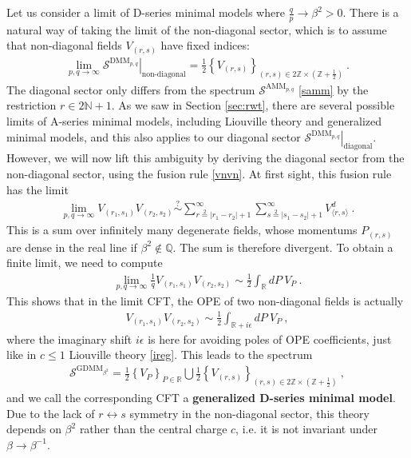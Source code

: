 \documentclass[12pt, a4paper]{article}
\newcommand{\myindex}[1]{\textbf{\boldmath #1}}
\theoremstyle{break}
\begin{document}
Let us consider a limit of D-series minimal models where $\frac{q}{p}\to \beta^2>0$. There is a natural way of taking the limit of the non-diagonal sector, which is to assume that non-diagonal fields $V_{(r,s)}$ have fixed indices:
\begin{align}
 \lim_{p,q\to\infty} \left. \mathcal{S}^{\text{DMM}_{p,q}} \right|_{\text{non-diagonal}} = 
 \frac12\left\{V_{(r,s)} \right\}_{ (r,s)\in 2\mathbb{Z}\times (\mathbb{Z}+\frac12)}\ .
\end{align}
The diagonal sector only differs from the spectrum $\mathcal{S}^{\text{AMM}_{p,q}}$ \eqref{samm} by the restriction $r\in 2\mathbb{N}+1$. 
As we saw in Section \ref{sec:rwt}, there are several possible limits of A-series minimal models, including Liouville theory and generalized minimal models, and this also applies to our diagonal sector $\left. \mathcal{S}^{\text{DMM}_{p,q}} \right|_{\text{diagonal}} $. However, we will now lift this ambiguity by deriving the diagonal sector from the non-diagonal sector, using the fusion rule \eqref{vnvn}. At first sight, this fusion rule has the limit  
\begin{align}
 \lim_{p,q\to\infty} V_{(r_1,s_1)} V_{(r_2,s_2)}  \overset{?}{\sim} \sum_{r\overset{2}{=}|r_1-r_2|+1}^{\infty} \sum_{s\overset{2}{=}|s_1-s_2|+1}^{\infty} V^d_{\langle r,s\rangle}\ .
\end{align}
This is a sum over infinitely many degenerate fields, whose momentums $P_{(r,s)}$ are dense in the real line if $\beta^2\notin \mathbb{Q}$. The sum is therefore divergent. To obtain a finite limit, we need to compute 
\begin{align}
 \lim_{p,q\to\infty} \frac{1}{q} V_{(r_1,s_1)} V_{(r_2,s_2)} \sim \frac12 \int_\mathbb{R} dP \ V_P\ .
\end{align}
This shows that in the limit CFT, the OPE of two non-diagonal fields is actually 
\begin{align}
 V_{(r_1,s_1)}V_{(r_2,s_2)} \sim \frac12 \int_{\mathbb{R}+i\epsilon} dP\ V_P\ ,
 \label{vrsvrs}
\end{align}
where the imaginary shift $i\epsilon$ is here for avoiding poles of OPE coefficients, just like in $c\leq 1$ Liouville theory \eqref{ireg}. This leads to the spectrum
\begin{align}
\boxed{\mathcal{S}^{\text{GDMM}_{\beta^2}} = \frac12 \left\{V_P\right\}_{P\in \mathbb{R}} \bigcup  \frac12\left\{V_{(r,s)} \right\}_{ (r,s)\in 2\mathbb{Z}\times (\mathbb{Z}+\frac12)}  }\ ,
\end{align}
and we call the corresponding CFT a \myindex{generalized D-series minimal model}. Due to the lack of $r\leftrightarrow s$ symmetry in the non-diagonal sector, this theory depends on $\beta^2$ rather than the central charge $c$, i.e. it is not invariant under $\beta \to \beta^{-1}$. 
\end{document}
